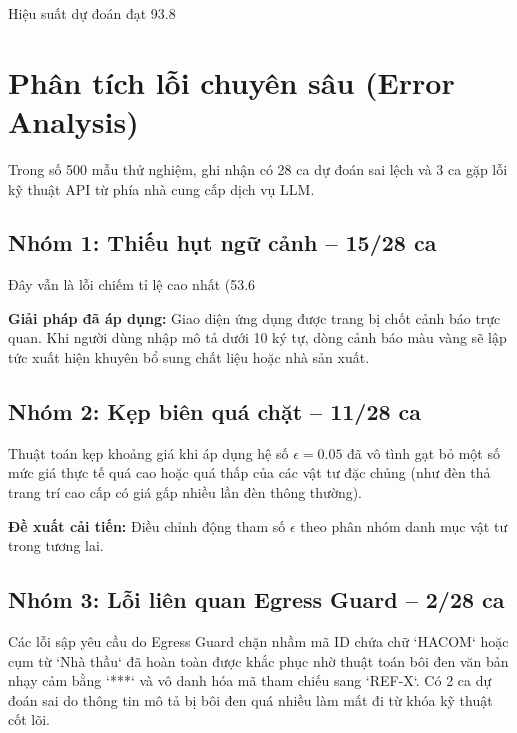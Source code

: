 Hiệu suất dự đoán đạt 93.8%

\section{Phân tích lỗi chuyên sâu (Error Analysis)}

Trong số 500 mẫu thử nghiệm, ghi nhận có 28 ca dự đoán sai lệch và 3 ca gặp lỗi kỹ thuật API từ phía nhà cung cấp dịch vụ LLM.

\subsection{Nhóm 1: Thiếu hụt ngữ cảnh -- 15/28 ca}

Đây vẫn là lỗi chiếm tỉ lệ cao nhất (53.6%

\textbf{Giải pháp đã áp dụng:} Giao diện ứng dụng được trang bị chốt cảnh báo trực quan. Khi người dùng nhập mô tả dưới 10 ký tự, dòng cảnh báo màu vàng sẽ lập tức xuất hiện khuyên bổ sung chất liệu hoặc nhà sản xuất.

\subsection{Nhóm 2: Kẹp biên quá chặt -- 11/28 ca}

Thuật toán kẹp khoảng giá khi áp dụng hệ số $\epsilon = 0.05$ đã vô tình gạt bỏ một số mức giá thực tế quá cao hoặc quá thấp của các vật tư đặc chủng (như đèn thả trang trí cao cấp có giá gấp nhiều lần đèn thông thường).

\textbf{Đề xuất cải tiến:} Điều chỉnh động tham số $\epsilon$ theo phân nhóm danh mục vật tư trong tương lai.

\subsection{Nhóm 3: Lỗi liên quan Egress Guard -- 2/28 ca}

Các lỗi sập yêu cầu do Egress Guard chặn nhầm mã ID chứa chữ `HACOM` hoặc cụm từ `Nhà thầu` đã hoàn toàn được khắc phục nhờ thuật toán bôi đen văn bản nhạy cảm bằng `***` và vô danh hóa mã tham chiếu sang `REF-X`. Có 2 ca dự đoán sai do thông tin mô tả bị bôi đen quá nhiều làm mất đi từ khóa kỹ thuật cốt lõi.


